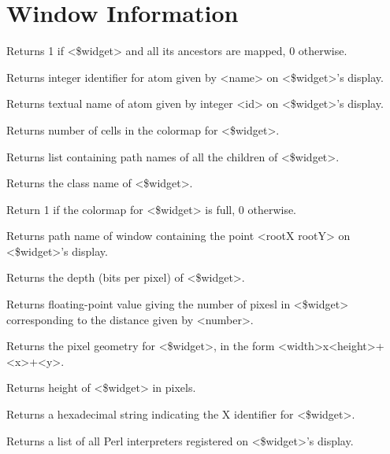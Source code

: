 
\section{Window Information}

\begin{enum}{1cm}

Returns 1 if <\$widget> and all its ancestors are mapped, 0 otherwise.

Returns integer identifier for atom given by <name> on <\$widget>'s display.

Returns textual name of atom given by integer <id> on <\$widget>'s display.

Returns number of cells in the colormap for <\$widget>.

Returns list containing path names of all the children of <\$widget>.

Returns the class name of <\$widget>.

Return 1 if the colormap for <\$widget> is full, 0 otherwise.

Returns path name of window containing the point <rootX rootY>
on <\$widget>'s display.

Returns the depth (bits per pixel) of <\$widget>.

Returns floating-point value giving the number of pixesl in <\$widget>
corresponding to the distance given by <number>.

Returns the pixel geometry for <\$widget>, in the form <width>x<height>+<x>+<y>.

Returns height of <\$widget> in pixels.

Returns  a hexadecimal string indicating the X  identifier for <\$widget>.

Returns a list of all Perl interpreters registered on <\$widget>'s display.


\end{enum}
